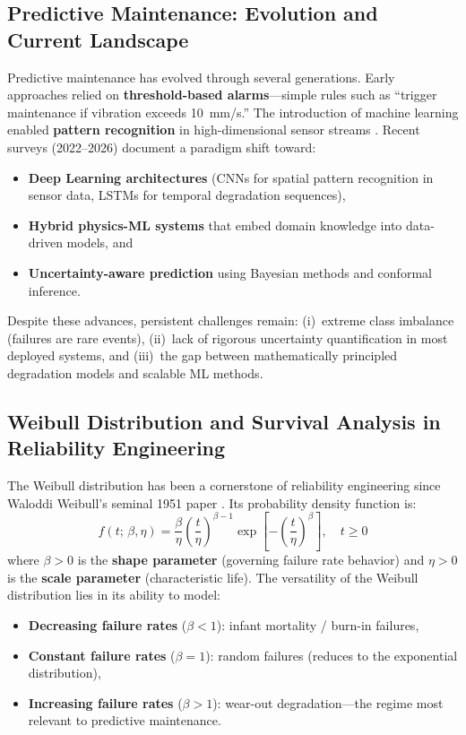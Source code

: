\documentclass[12pt, a4paper]{article}
\begin{document}
\subsection{Predictive Maintenance: Evolution and Current Landscape}

Predictive maintenance has evolved through several generations. Early approaches relied on \textbf{threshold-based alarms}---simple rules such as ``trigger maintenance if vibration exceeds 10~mm/s.'' The introduction of machine learning enabled \textbf{pattern recognition} in high-dimensional sensor streams \citep{carvalho2019}. Recent surveys (2022--2026) document a paradigm shift toward:

\begin{itemize}[leftmargin=*]
    \item \textbf{Deep Learning architectures} (CNNs for spatial pattern recognition in sensor data, LSTMs for temporal degradation sequences),
    \item \textbf{Hybrid physics-ML systems} that embed domain knowledge into data-driven models, and
    \item \textbf{Uncertainty-aware prediction} using Bayesian methods and conformal inference.
\end{itemize}

Despite these advances, persistent challenges remain: (i)~extreme class imbalance (failures are rare events), (ii)~lack of rigorous uncertainty quantification in most deployed systems, and (iii)~the gap between mathematically principled degradation models and scalable ML methods.

\subsection{Weibull Distribution and Survival Analysis in Reliability Engineering}

The Weibull distribution has been a cornerstone of reliability engineering since Waloddi Weibull's seminal 1951 paper \citep{weibull1951}. Its probability density function is:
\begin{equation}\label{eq:weibull-pdf}
    f(t;\,\beta,\eta) = \frac{\beta}{\eta}\left(\frac{t}{\eta}\right)^{\!\beta-1} \exp\!\left[-\left(\frac{t}{\eta}\right)^{\!\beta}\right], \quad t \geq 0
\end{equation}
where $\beta > 0$ is the \textbf{shape parameter} (governing failure rate behavior) and $\eta > 0$ is the \textbf{scale parameter} (characteristic life). The versatility of the Weibull distribution lies in its ability to model:
\begin{itemize}[leftmargin=*]
    \item \textbf{Decreasing failure rates} ($\beta < 1$): infant mortality / burn-in failures,
    \item \textbf{Constant failure rates} ($\beta = 1$): random failures (reduces to the exponential distribution),
    \item \textbf{Increasing failure rates} ($\beta > 1$): wear-out degradation---the regime most relevant to predictive maintenance.
\end{itemize}
\end{document}
